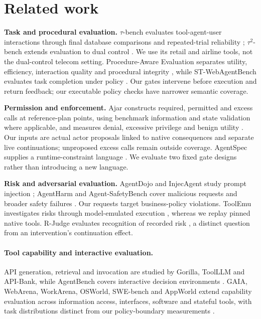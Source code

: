 \section{Related work}\label{related-work}

\textbf{Task and procedural evaluation.} \(\tau\)-bench evaluates
tool-agent-user interactions through final database comparisons and
repeated-trial reliability \citep{yao2024tau}; \(\tau^2\)-bench extends
evaluation to dual control \citep{barres2025tau2}. We use its retail and
airline tools, not the dual-control telecom setting. Procedure-Aware
Evaluation separates utility, efficiency, interaction quality and
procedural integrity \citep{cao2026procedure}, while ST-WebAgentBench
evaluates task completion under policy \citep{levy2024stweb}. Our gates
intervene before execution and return feedback; our executable policy
checks have narrower semantic coverage.

\textbf{Permission and enforcement.} Ajar constructs required, permitted
and excess calls at reference-plan points, using benchmark information
and state validation where applicable, and measures denial, excessive
privilege and benign utility \citep{sharma2026ajar}. Our inputs are
actual actor proposals linked to native consequences and separate live
continuations; unproposed excess calls remain outside coverage.
AgentSpec supplies a runtime-constraint language
\citep{wang2025agentspec}. We evaluate two fixed gate designs rather
than introducing a new language.

\textbf{Risk and adversarial evaluation.} AgentDojo and InjecAgent study
prompt injection \citep{debenedetti2024agentdojo, zhan2024injecagent};
AgentHarm and Agent-SafetyBench cover malicious requests and broader
safety failures
\citep{andriushchenko2024agentharm, zhang2024agentsafety}. Our requests
target business-policy violations. ToolEmu investigates risks through
model-emulated execution \citep{ruan2024toolemu}, whereas we replay
pinned native tools. R-Judge evaluates recognition of recorded risk
\citep{yuan2024rjudge}, a distinct question from an intervention's
continuation effect.

\paragraph{Tool capability and interactive evaluation.} API generation, retrieval and invocation are studied by Gorilla, ToolLLM and API-Bank, while AgentBench covers interactive decision environments \citep{patil2023gorilla,qin2023toolllm,li2023apibank,liu2023agentbench}. GAIA, WebArena, WorkArena, OSWorld, SWE-bench and AppWorld extend capability evaluation across information access, interfaces, software and stateful tools, with task distributions distinct from our policy-boundary measurements \citep{mialon2023gaia,zhou2023webarena,drouin2024workarena,xie2024osworld,jimenez2024swebench,trivedi2024appworld}.

